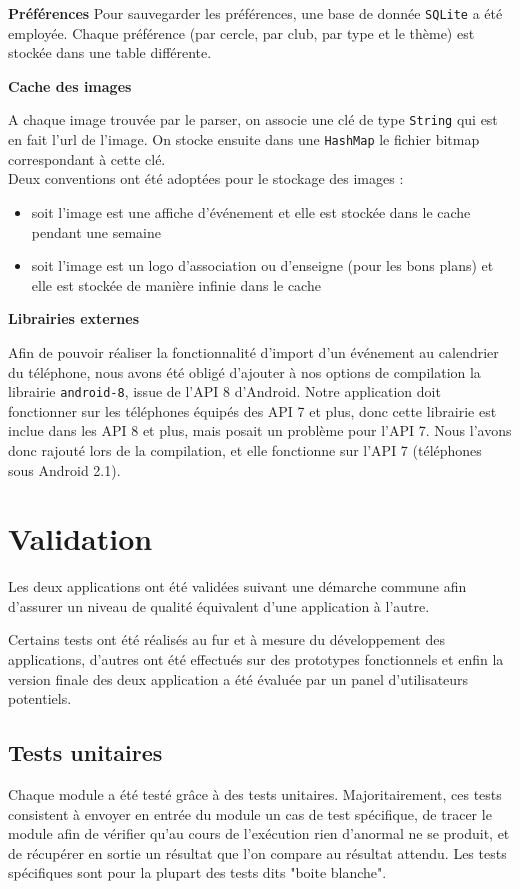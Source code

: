 \documentclass[a4paper, 11px]{article}
\begin{document}
{\bf Préférences}
Pour sauvegarder les préférences, une base de donnée \texttt{SQLite} a été employée. Chaque préférence (par cercle, par club, par type et le thème) est stockée dans une table différente.
 
{\bf Cache des images}

A chaque image trouvée par le parser, on associe une clé de type \texttt{String} qui est en fait l'url de l'image. On stocke ensuite dans une \texttt{HashMap} le fichier bitmap correspondant à cette clé.\\
Deux conventions ont été adoptées pour le stockage des images :
\begin{itemize}
\item soit l'image est une affiche d'événement et elle est stockée dans le cache pendant une semaine
\item soit l'image est un logo d'association ou d'enseigne (pour les bons plans) et elle est stockée de manière infinie dans le cache\\
\end{itemize}

{\bf Librairies externes}

Afin de pouvoir réaliser la fonctionnalité d'import d'un événement au calendrier du téléphone, nous avons été obligé d'ajouter à nos options de compilation la librairie \texttt{android-8}, issue de l'API 8 d'Android. Notre application doit fonctionner sur les téléphones équipés des API 7 et plus, donc cette librairie est inclue dans les API 8 et plus, mais posait un problème pour l'API 7. Nous l'avons donc rajouté lors de la compilation, et elle fonctionne sur l'API 7 (téléphones sous Android 2.1).


\section{Validation}
Les deux applications ont été validées suivant une démarche commune afin d'assurer un niveau de qualité équivalent d'une application à l'autre.

Certains tests ont été réalisés au fur et à mesure du développement des applications, d'autres ont été effectués sur des prototypes fonctionnels et enfin la version finale des deux application a été évaluée par un panel d'utilisateurs potentiels.

\subsection{Tests unitaires}
Chaque module a été testé grâce à des tests unitaires. Majoritairement, ces tests consistent à envoyer en entrée du module un cas de test spécifique, de tracer le module afin de vérifier qu'au cours de l’exécution rien d'anormal ne se produit, et de récupérer en sortie un résultat que l'on compare au résultat attendu. Les tests spécifiques sont pour la plupart des tests dits "boite blanche".
\end{document}
